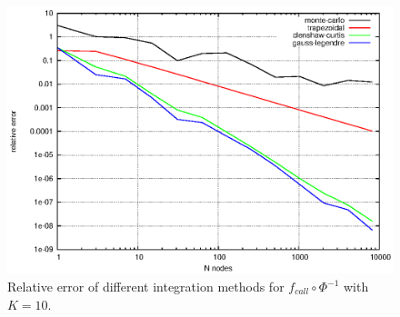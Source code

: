 \documentclass[]{article}
\begin{document}
\begin{figure}[!ht]
\centering
\includegraphics{task10Plot_10}
\caption{Relative error of different integration methods for
$f_{call}\circ \Phi^{-1}$ with $K = 10$.}
\label{fig:Task10_10}
\end{figure}
\end{document}
